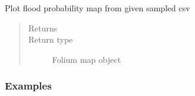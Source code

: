 \documentclass[letterpaper,10pt,english]{sphinxmanual}
\begin{document}
\begin{fulllineitems}
\label{\detokenize{index:flood_tool.plot_flood_prob_sampled}}
\sphinxAtStartPar
Plot flood probability map from given sampled csv
\begin{quote}\begin{description}
\item[{Returns}] \leavevmode
\sphinxAtStartPar


\item[{Return type}] \leavevmode
\sphinxAtStartPar
Folium map object

\end{description}\end{quote}
\subsubsection*{Examples}

\begin{sphinxVerbatim}[commandchars=\\\{\}]
  
\end{sphinxVerbatim}

\end{fulllineitems}

\end{document}
